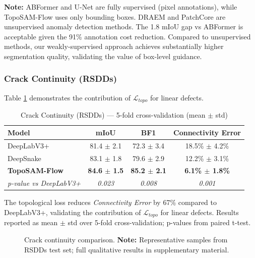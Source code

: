 \documentclass[12pt, a4paper]{article}
\newcommand{\calL}{\mathcal{L}}
\begin{document}
\textbf{Note:} ABFormer and U-Net are fully supervised (pixel annotations), while TopoSAM-Flow uses only bounding boxes. DRAEM and PatchCore are unsupervised anomaly detection methods. The 1.8 mIoU gap vs ABFormer is acceptable given the 91\% annotation cost reduction. Compared to unsupervised methods, our weakly-supervised approach achieves substantially higher segmentation quality, validating the value of box-level guidance.

\subsubsection{Crack Continuity (RSDDs)}

Table \ref{tab:rsdds_results} demonstrates the contribution of $\calL_{topo}$ for linear defects.

\begin{table}[h]
\centering
\caption{Crack Continuity (RSDDs) — 5-fold cross-validation (mean $\pm$ std)}
\label{tab:rsdds_results}
\begin{tabular}{lccc}
\toprule
\textbf{Model} & \textbf{mIoU} & \textbf{BF1} & \textbf{Connectivity Error} \\
\midrule
DeepLabV3+ \cite{chen2018deeplabv3plus} & 81.4 $\pm$ 2.1 & 72.3 $\pm$ 3.4 & 18.5\% $\pm$ 4.2\% \\
DeepSnake \cite{peng2020deepsnake} & 83.1 $\pm$ 1.8 & 79.6 $\pm$ 2.9 & 12.2\% $\pm$ 3.1\% \\
\textbf{TopoSAM-Flow} & \textbf{84.6 $\pm$ 1.5} & \textbf{85.2 $\pm$ 2.1} & \textbf{6.1\% $\pm$ 1.8\%} \\
\midrule
\textit{p-value vs DeepLabV3+} & \textit{0.023} & \textit{0.008} & \textit{0.001} \\
\bottomrule
\end{tabular}
\end{table}

The topological loss reduces \textit{Connectivity Error} by 67\% compared to DeepLabV3+, validating the contribution of $\calL_{topo}$ for linear defects. Results reported as mean $\pm$ std over 5-fold cross-validation; p-values from paired t-test.

\begin{figure}[h]
\centering
{}
\caption{Crack continuity comparison. \textbf{Note:} Representative samples from RSDDs test set; full qualitative results in supplementary material.}
\label{fig:crack_continuity}
\end{figure}
\end{document}

